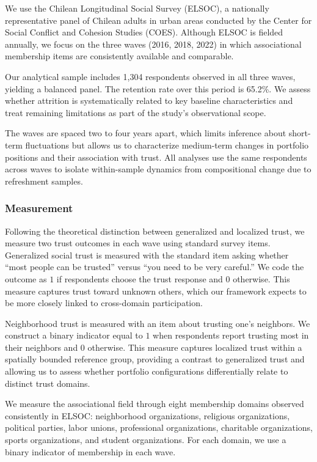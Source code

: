 We use the Chilean Longitudinal Social Survey (ELSOC), a nationally representative panel of Chilean adults in urban areas conducted by the Center for Social Conflict and Cohesion Studies (COES). Although ELSOC is fielded annually, we focus on the three waves (2016, 2018, 2022) in which associational membership items are consistently available and comparable.

Our analytical sample includes 1{,}304 respondents observed in all three waves, yielding a balanced panel. The retention rate over this period is 65.2\%. We assess whether attrition is systematically related to key baseline characteristics and treat remaining limitations as part of the study's observational scope.

The waves are spaced two to four years apart, which limits inference about short-term fluctuations but allows us to characterize medium-term changes in portfolio positions and their association with trust. All analyses use the same respondents across waves to isolate within-sample dynamics from compositional change due to refreshment samples.

\subsubsection{Measurement}


Following the theoretical distinction between generalized and localized trust, we measure two trust outcomes in each wave using standard survey items. Generalized social trust is measured with the standard item asking whether ``most people can be trusted'' versus ``you need to be very careful.'' We code the outcome as $1$ if respondents choose the trust response and $0$ otherwise. This measure captures trust toward unknown others, which our framework expects to be more closely linked to cross-domain participation.

Neighborhood trust is measured with an item about trusting one's neighbors. We construct a binary indicator equal to $1$ when respondents report trusting most in their neighbors and $0$ otherwise. This measure captures localized trust within a spatially bounded reference group, providing a contrast to generalized trust and allowing us to assess whether portfolio configurations differentially relate to distinct trust domains.

We measure the associational field through eight membership domains observed consistently in ELSOC: neighborhood organizations, religious organizations, political parties, labor unions, professional organizations, charitable organizations, sports organizations, and student organizations. For each domain, we use a binary indicator of membership in each wave.

